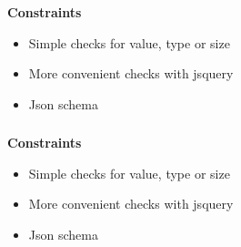 \documentclass[usenames,dvipsnames, 18pt, compress, aspectratio=169]{beamer}
\begin{document}
\begin{frame}
    \frametitle{}
    \begin{center}
    \textbf{Constraints}

        \begin{itemize}[label={\MVRightarrow}]
            \item Simple checks for value, type or size
            \item More convenient checks with jsquery
            \item Json schema
        \end{itemize}

    \end{center}
\end{frame}

\begin{frame}
    \frametitle{}
    \begin{center}
    \textbf{Constraints}

        \begin{itemize}[label={\MVRightarrow}]
            \item Simple checks for value, type or size
            \item More convenient checks with jsquery
            \item Json schema
        \end{itemize}

    \end{center}
\end{frame}

\end{document}
